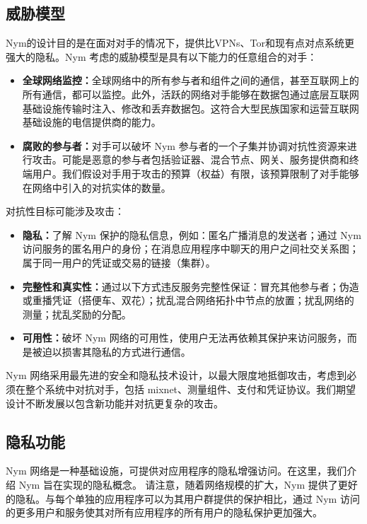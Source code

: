 \documentclass{article}
\begin{document}
	\subsection{威胁模型}

	Nym的设计目的是在面对对手的情况下，提供比VPNs、Tor和现有点对点系统更强大的隐私。Nym 考虑的威胁模型是具有以下能力的任意组合的对手：
	
\begin{itemize}
\item \textbf{全球网络监控：}全球网络中的所有参与者和组件之间的通信，甚至互联网上的所有通信，都可以监控。此外，活跃的网络对手能够在数据包通过底层互联网基础设施传输时注入、修改和丢弃数据包。这符合大型民族国家和运营互联网基础设施的电信提供商的能力。
\item \textbf{腐败的参与者：}对手可以破坏 Nym 参与者的一个子集并协调对抗性资源来进行攻击。可能是恶意的参与者包括验证器、混合节点、网关、服务提供商和终端用户。我们假设对手用于攻击的预算（权益）有限，该预算限制了对手能够在网络中引入的对抗实体的数量。
\end{itemize}

	对抗性目标可能涉及攻击：
	
\begin{itemize}
\item \textbf{隐私：}了解 Nym 保护的隐私信息，例如：匿名广播消息的发送者；通过 Nym 访问服务的匿名用户的身份；在消息应用程序中聊天的用户之间社交关系图；属于同一用户的凭证或交易的链接（集群）。
\item \textbf{完整性和真实性：}通过以下方式违反服务完整性保证：冒充其他参与者；伪造或重播凭证（搭便车、双花）；扰乱混合网络拓扑中节点的放置；扰乱网络的测量；扰乱奖励的分配。
\item \textbf{可用性：}破坏 Nym 网络的可用性，使用户无法再依赖其保护来访问服务，而是被迫以损害其隐私的方式进行通信。
\end{itemize}

	Nym 网络采用最先进的安全和隐私技术设计，以最大限度地抵御攻击，考虑到必须在整个系统中对抗对手，包括 mixnet、测量组件、支付和凭证协议。我们期望设计不断发展以包含新功能并对抗更复杂的攻击。\newline

	\subsection{隐私功能}

	Nym 网络是一种基础设施，可提供对应用程序的隐私增强访问。在这里，我们介绍 Nym 旨在实现的隐私概念。 请注意，随着网络规模的扩大，Nym 提供了更好的隐私。与每个单独的应用程序可以为其用户群提供的保护相比，通过 Nym 访问的更多用户和服务使其对所有应用程序的所有用户的隐私保护更加强大。\newline
\end{document}
